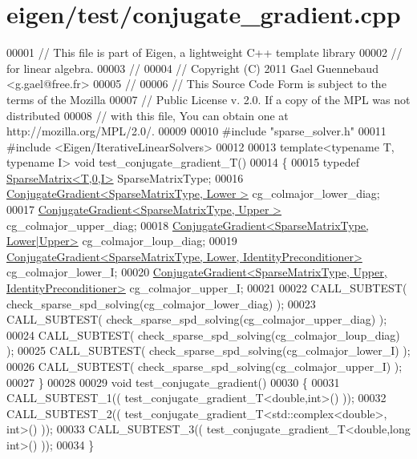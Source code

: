 \hypertarget{eigen_2test_2conjugate__gradient_8cpp_source}{}\section{eigen/test/conjugate\+\_\+gradient.cpp}
\label{eigen_2test_2conjugate__gradient_8cpp_source}

\begin{DoxyCode}
00001 \textcolor{comment}{// This file is part of Eigen, a lightweight C++ template library}
00002 \textcolor{comment}{// for linear algebra.}
00003 \textcolor{comment}{//}
00004 \textcolor{comment}{// Copyright (C) 2011 Gael Guennebaud <g.gael@free.fr>}
00005 \textcolor{comment}{//}
00006 \textcolor{comment}{// This Source Code Form is subject to the terms of the Mozilla}
00007 \textcolor{comment}{// Public License v. 2.0. If a copy of the MPL was not distributed}
00008 \textcolor{comment}{// with this file, You can obtain one at http://mozilla.org/MPL/2.0/.}
00009 
00010 \textcolor{preprocessor}{#include "sparse\_solver.h"}
00011 \textcolor{preprocessor}{#include <Eigen/IterativeLinearSolvers>}
00012 
00013 \textcolor{keyword}{template}<\textcolor{keyword}{typename} T, \textcolor{keyword}{typename} I> \textcolor{keywordtype}{void} test\_conjugate\_gradient\_T()
00014 \{
00015   \textcolor{keyword}{typedef} \hyperlink{group___sparse_core___module_class_eigen_1_1_sparse_matrix}{SparseMatrix<T,0,I>} SparseMatrixType;
00016   \hyperlink{group___iterative_linear_solvers___module_class_eigen_1_1_conjugate_gradient}{ConjugateGradient<SparseMatrixType, Lower      >} 
      cg\_colmajor\_lower\_diag;
00017   \hyperlink{group___iterative_linear_solvers___module_class_eigen_1_1_conjugate_gradient}{ConjugateGradient<SparseMatrixType, Upper      >} 
      cg\_colmajor\_upper\_diag;
00018   \hyperlink{group___iterative_linear_solvers___module_class_eigen_1_1_conjugate_gradient}{ConjugateGradient<SparseMatrixType, Lower|Upper>} 
      cg\_colmajor\_loup\_diag;
00019   \hyperlink{group___iterative_linear_solvers___module_class_eigen_1_1_conjugate_gradient}{ConjugateGradient<SparseMatrixType, Lower, IdentityPreconditioner>}
       cg\_colmajor\_lower\_I;
00020   \hyperlink{group___iterative_linear_solvers___module_class_eigen_1_1_conjugate_gradient}{ConjugateGradient<SparseMatrixType, Upper, IdentityPreconditioner>}
       cg\_colmajor\_upper\_I;
00021 
00022   CALL\_SUBTEST( check\_sparse\_spd\_solving(cg\_colmajor\_lower\_diag)  );
00023   CALL\_SUBTEST( check\_sparse\_spd\_solving(cg\_colmajor\_upper\_diag)  );
00024   CALL\_SUBTEST( check\_sparse\_spd\_solving(cg\_colmajor\_loup\_diag)   );
00025   CALL\_SUBTEST( check\_sparse\_spd\_solving(cg\_colmajor\_lower\_I)     );
00026   CALL\_SUBTEST( check\_sparse\_spd\_solving(cg\_colmajor\_upper\_I)     );
00027 \}
00028 
00029 \textcolor{keywordtype}{void} test\_conjugate\_gradient()
00030 \{
00031   CALL\_SUBTEST\_1(( test\_conjugate\_gradient\_T<double,int>() ));
00032   CALL\_SUBTEST\_2(( test\_conjugate\_gradient\_T<std::complex<double>, \textcolor{keywordtype}{int}>() ));
00033   CALL\_SUBTEST\_3(( test\_conjugate\_gradient\_T<double,long int>() ));
00034 \}
\end{DoxyCode}

